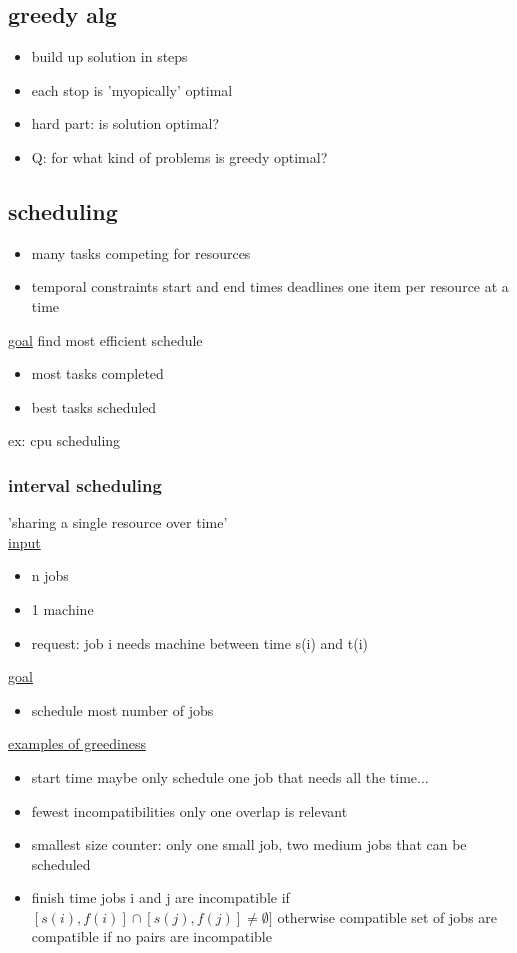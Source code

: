 \documentclass[a4paper]{article}
\newcommand{\bi}{\begin{itemize}}
\newcommand{\ei}{\end{itemize}}
\begin{document}
{    \subsection{greedy alg}
      \bi
        \item build up solution in steps
        \item each stop is 'myopically' optimal
        \item hard part: is solution optimal?
        \item[Q:] for what kind of problems is greedy optimal?
      \ei
    \subsection{scheduling}
      \bi
        \item many tasks competing for resources
        \item temporal constraints
          \subitem start and end times
          \subitem deadlines
          \subitem one item per resource at a time
      \ei
      \underline{goal} find most efficient schedule
      \bi
        \item most tasks completed
        \item best tasks scheduled
      \ei
      ex: cpu scheduling
      \subsubsection{interval scheduling}
        'sharing a single resource over time'\\
        \underline{input}
        \bi
          \item n jobs
          \item 1 machine
          \item request: job i needs machine between time s(i) and t(i)
        \ei
        \underline{goal}
        \bi
          \item[] schedule most number of jobs
        \ei
        
        \underline{examples of greediness}
        \bi
          \item start time
            \subitem maybe only schedule one job that needs all the time...
          \item fewest incompatibilities
            \subitem only one overlap is relevant
          \item smallest size
            \subitem counter: only one small job, two medium jobs that can be scheduled
          \item finish time
            \subitem[Def:] jobs i and j are incompatible if $[s(i),f(i)]\cap[s(j),f(j)]\neq \emptyset]$
            \subitem[] otherwise compatible
            \subitem[] set of jobs are compatible if no pairs are incompatible
        \ei
}
\end{document}
